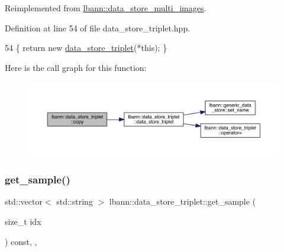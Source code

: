 Reimplemented from \hyperlink{classlbann_1_1data__store__multi__images_a1046efda9448bab9b42e9fcdf71e03f1}{lbann\+::data\+\_\+store\+\_\+multi\+\_\+images}.



Definition at line 54 of file data\+\_\+store\+\_\+triplet.\+hpp.


\begin{DoxyCode}
54 \{ \textcolor{keywordflow}{return} \textcolor{keyword}{new} \hyperlink{classlbann_1_1data__store__triplet_ad6ba997401d292ffb9678a75e02a258f}{data\_store\_triplet}(*\textcolor{keyword}{this}); \}
\end{DoxyCode}
Here is the call graph for this function\+:\nopagebreak
\begin{figure}[H]
\begin{center}
\leavevmode
\includegraphics[width=350pt]{classlbann_1_1data__store__triplet_a446ee3b1fa3097e51bd0e198de960cd4_cgraph}
\end{center}
\end{figure}
\mbox{\label{classlbann_1_1data__store__triplet_ade5d2290c85e7916e828553f4ab4f379}} 
\subsubsection{\texorpdfstring{get\+\_\+sample()}{get\_sample()}}
{\footnotesize\ttfamily std\+::vector$<$ std\+::string $>$ lbann\+::data\+\_\+store\+\_\+triplet\+::get\+\_\+sample (\begin{DoxyParamCaption}\item[{size\+\_\+t}]{idx }\end{DoxyParamCaption}) const\hspace{0.3cm}{\ttfamily [override]}, {\ttfamily [protected]}, {\ttfamily [virtual]}}



